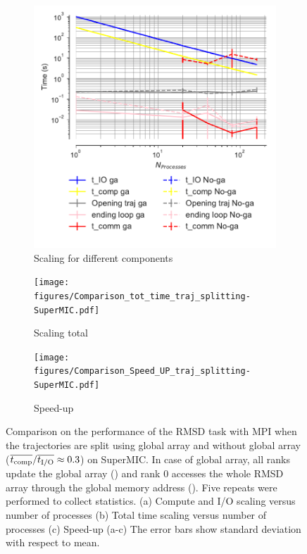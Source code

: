  \begin{figure}[ht!]
\centering
\begin{subfigure}{.3\textwidth}
  \includegraphics[width=\linewidth]{figures/Comparison_IO_compute_scaling_traj_splitting-SuperMIC.pdf}
  \captionsetup{format=hang}
  \caption{Scaling for different components}
  \label{fig:MPIscaling-SuperMIC}
\end{subfigure}
\hfill
\begin{subfigure}{.3\textwidth}
  \texttt{[image: figures/Comparison\_tot\_time\_traj\_splitting-SuperMIC.pdf]}
  \caption{Scaling total}
  \label{fig:MPItottime-SuperMIC}
\end{subfigure}
\hfill
\begin{subfigure}{.3\textwidth}
  \texttt{[image: figures/Comparison\_Speed\_UP\_traj\_splitting-SuperMIC.pdf]}
  \caption{Speed-up}
  \label{fig:MPIspeedup-SuperMIC}
\end{subfigure}

\caption{Comparison on the performance of the RMSD task with MPI when the trajectories are split using global array and without global array ($\overline{{t}_{\text{comp}}}/\overline{{t}_{\text{I/O}}} \approx 0.3$) on SuperMIC.
In case of global array, all ranks update the global array () and rank 0 accesses the whole RMSD array through the global memory address ().
Five repeats were performed to collect statistics. (a) Compute and I/O scaling versus number of processes (b) Total time scaling versus number of processes (c) Speed-up (a-c) The error bars show standard deviation with respect to mean.}
\label{fig:MPIwithIO-split-SuperMIC}
\end{figure}

